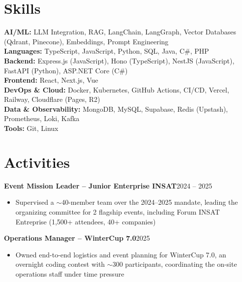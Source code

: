 \documentclass[10pt,a4paper]{article}
\newcommand{\entry}[2]{\vspace{1pt}\noindent\textbf{#1}\hfill{\color{muted}#2}\par}
\begin{document}
\section{Skills}
\textbf{AI/ML:} LLM Integration, RAG, LangChain, LangGraph, Vector Databases (Qdrant, Pinecone), Embeddings, Prompt Engineering\\
\textbf{Languages:} TypeScript, JavaScript, Python, SQL, Java, C\#, PHP\\
\textbf{Backend:} Express.js (JavaScript), Hono (TypeScript), NestJS (JavaScript), FastAPI (Python), ASP.NET Core (C\#)\\
\textbf{Frontend:} React, Next.js, Vue\\
\textbf{DevOps \& Cloud:} Docker, Kubernetes, GitHub Actions, CI/CD, Vercel, Railway, Cloudflare (Pages, R2)\\
\textbf{Data \& Observability:} MongoDB, MySQL, Supabase, Redis (Upstash), Prometheus, Loki, Kafka\\
\textbf{Tools:} Git, Linux

\section{Activities}
\entry{Event Mission Leader -- Junior Enterprise INSAT}{2024 -- 2025}
\begin{itemize}
  \item Supervised a $\sim$40-member team over the 2024--2025 mandate, leading the organizing committee for 2 flagship events, including Forum INSAT Entreprise (1,500+ attendees, 40+ companies)
\end{itemize}
\entry{Operations Manager -- WinterCup 7.0}{2025}
\begin{itemize}
  \item Owned end-to-end logistics and event planning for WinterCup 7.0, an overnight coding contest with $\sim$300 participants, coordinating the on-site operations staff under time pressure
\end{itemize}
\end{document}
